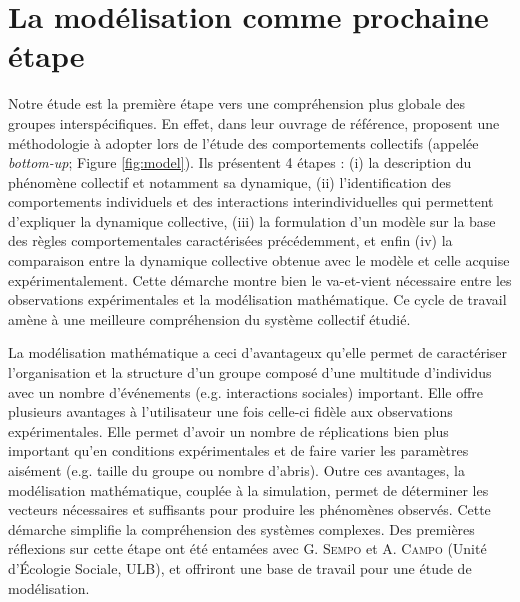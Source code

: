 		\section{La modélisation comme prochaine étape}  
        
Notre étude est la première étape vers une compréhension plus globale des groupes interspécifiques. En effet, dans leur ouvrage de référence, \citet{camazine_self-organization_2001} proposent une méthodologie à adopter lors de l'étude des comportements collectifs (appelée \textit{bottom-up}; Figure \ref{fig:model}). Ils présentent 4 étapes : (i) la description du phénomène collectif et notamment sa dynamique, (ii) l'identification des comportements individuels et des interactions interindividuelles qui permettent d'expliquer la dynamique collective, (iii) la formulation d'un modèle sur la base des règles comportementales caractérisées précédemment, et enfin (iv) la comparaison entre la dynamique collective obtenue avec le modèle et celle acquise expérimentalement. Cette démarche montre bien le va-et-vient nécessaire entre les observations expérimentales et la modélisation mathématique. Ce cycle de travail amène à une meilleure compréhension du système collectif étudié.

La modélisation mathématique a ceci d'avantageux qu'elle permet de caractériser l'organisation et la structure d'un groupe composé d'une multitude d'individus avec un nombre d'événements (e.g. interactions sociales) important. Elle offre plusieurs avantages à l'utilisateur une fois celle-ci fidèle aux observations expérimentales. Elle permet d'avoir un nombre de réplications bien plus important qu'en conditions expérimentales et de faire varier les paramètres aisément (e.g. taille du groupe ou nombre d'abris). Outre ces avantages, la modélisation mathématique, couplée à la simulation, permet de déterminer les vecteurs nécessaires et suffisants pour produire les phénomènes observés. Cette démarche simplifie la compréhension des systèmes complexes. Des premières réflexions sur cette étape ont été entamées avec G. \textsc{Sempo} et A. \textsc{Campo} (Unité d'Écologie Sociale, ULB), et offriront une base de travail pour une étude de modélisation.

